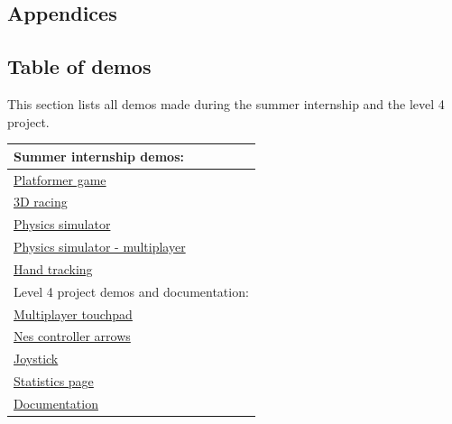 \documentclass{l4proj}
\begin{document}
\begin{appendices}
\chapter{Appendices}
\section{Table of demos}
This section lists all demos made during the summer internship and the level 4 project.\\

{
\begin{tabularx}{\textwidth} { 
  | >{\centering\arraybackslash}X |
 }
 \hline
 Summer internship demos: \\
 \hline
 \href{https://emmapoliakova.github.io/WebRTCSmartphoneController/demo/tinyPlatformer/index.html}{Platformer game} \\
  \hline
 \href{https://emmapoliakova.github.io/WebRTCSmartphoneController/demo/3dRacing.html}{3D racing} \\
  \hline
 \href{https://emmapoliakova.github.io/WebRTCSmartphoneController/physics/physicsDemoV3.html}{Physics simulator} \\
 \hline
\href{https://emmapoliakova.github.io/WebRTCSmartphoneController/physics/physicsDemoV4.html}{Physics simulator - multiplayer} \\
 \hline
\href{https://emmapoliakova.github.io/WebRTCSmartphoneController/handtracking/receiveVideo.html}{Hand tracking} \\
\hline
Level 4 project demos and documentation: \\
\hline
\href{https://smartcontrollerjs.github.io/Controllers/touchpad-receive.html}{Multiplayer touchpad} \\
\hline
\href{https://smartcontrollerjs.github.io/Controllers/controller-receive.html}{Nes controller arrows} \\
\hline
\href{https://smartcontrollerjs.github.io/Controllers/joystick-receive.html}{Joystick} \\
\hline
\href{https://smartcontrollerjs.github.io/Controllers/stats.html}{Statistics page} \\
\hline
\href{https://smartcontrollerjs.github.io/SmartController/}{Documentation} \\
\hline
\end{tabularx}
}



\end{appendices}
\end{document}
